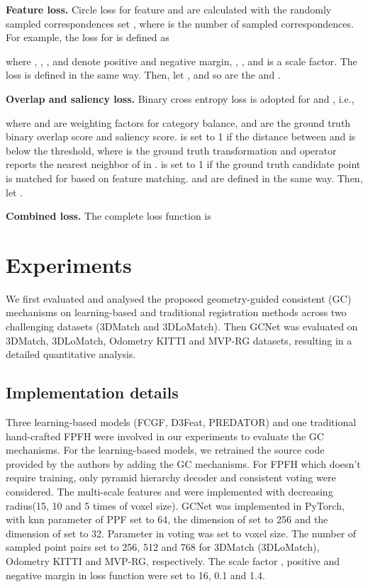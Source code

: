 \documentclass[10pt,twocolumn,letterpaper]{article}
\begin{document}
\textbf{Feature loss.} Circle loss for feature  and  are calculated with the randomly sampled correspondences set , where  is the number of sampled correspondences. For example, the loss  for  is defined as

where , , ,  and  denote positive and negative margin, , , and  is a scale factor. The loss  is defined in the same way. 
Then, let , and so are the  and . 

\textbf{Overlap and saliency loss.} Binary cross entropy loss is adopted for  and , i.e.,

where  and  are weighting factors for category balance,  and  are the ground truth binary overlap score and saliency score.  is set to 
1 if the distance between  and  is below the threshold, where  is the ground truth transformation and  operator reports the nearest neighbor of  in .  is set to 1 if the ground truth candidate point is matched for  based on feature matching.  and  are defined in the same way. Then, let . 

\textbf{Combined loss.} The complete loss function is 


\vspace{-1.75em}
\section{Experiments}
\vspace{-.25em}
We first evaluated and analysed the proposed geometry-guided consistent (GC) mechanisms on learning-based and traditional registration methods across two challenging datasets (3DMatch\cite{zeng20173dmatch} and 3DLoMatch\cite{huang2021predator}). Then GCNet was evaluated on 3DMatch\cite{zeng20173dmatch}, 3DLoMatch\cite{huang2021predator}, Odometry KITTI\cite{geiger2012we} and MVP-RG\cite{pan2021robust} datasets, resulting in a detailed quantitative analysis. 

\vspace{-.25em}
\subsection{Implementation details}
\vspace{-.25em}
Three learning-based models (FCGF\cite{choy2019fully}, D3Feat\cite{bai2020d3feat}, PREDATOR\cite{huang2021predator}) and one traditional hand-crafted FPFH\cite{rusu2009fast} were involved in our experiments to evaluate the GC mechanisms. For the learning-based models, we retrained the source code provided by the authors by adding the GC mechanisms. For FPFH which doesn't require training, only pyramid hierarchy decoder and consistent voting were considered. The multi-scale features  and  were implemented with decreasing radius(15, 10 and 5 times of voxel size). GCNet was implemented in PyTorch\cite{paszke2019pytorch}, with knn parameter  of PPF set to 64, the dimension  of  set to 256 and the dimension  of  set to 32. Parameter  in voting was set to  voxel size. The number of sampled point pairs  set to 256, 512 and 768 for 3DMatch (3DLoMatch), Odometry KITTI and MVP-RG, respectively. The scale factor , positive and negative margin  in loss function were set to 16, 0.1 and 1.4.
\end{document}
